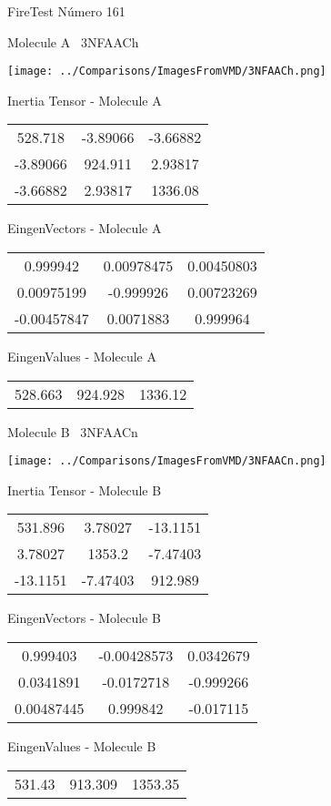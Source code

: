\vtab[-3cm]
\begin{center}
{\large FireTest \tab Número 161}
\end{center}
\begin{multicols}{2}
\begin{center}

Molecule A \
3NFAACh

\texttt{[image: ../Comparisons/ImagesFromVMD/3NFAACh.png]}

Inertia Tensor - Molecule A \\
\begin{tabular}{|c c c|}
528.718	 & 	-3.89066	 & 	-3.66882	 \\
-3.89066	 & 	924.911	 & 	2.93817	 \\
-3.66882	 & 	2.93817	 & 	1336.08
\end{tabular}

\vtab
 EingenVectors - Molecule A     \\
\begin{tabular}{|c c c|}
0.999942	 & 	0.00978475	 & 	0.00450803	 \\
0.00975199	 & 	-0.999926	 & 	0.00723269	 \\
-0.00457847	 & 	0.0071883	 & 	0.999964
\end{tabular}

\vtab
 EingenValues - Molecule A     \\
\begin{tabular}{|c c c|}
528.663	 & 	924.928	 & 	1336.12	 \\
\end{tabular}
\columnbreak

Molecule B \
3NFAACn

\texttt{[image: ../Comparisons/ImagesFromVMD/3NFAACn.png]}

Inertia Tensor - Molecule B \\
\begin{tabular}{|c c c|}
531.896	 & 	3.78027	 & 	-13.1151	 \\
3.78027	 & 	1353.2	 & 	-7.47403	 \\
-13.1151	 & 	-7.47403	 & 	912.989
\end{tabular}

\vtab
 EingenVectors - Molecule B     \\
\begin{tabular}{|c c c|}
0.999403	 & 	-0.00428573	 & 	0.0342679	 \\
0.0341891	 & 	-0.0172718	 & 	-0.999266	 \\
0.00487445	 & 	0.999842	 & 	-0.017115
\end{tabular}

\vtab
 EingenValues - Molecule B     \\
\begin{tabular}{|c c c|}
531.43	 & 	913.309	 & 	1353.35	 \\
\end{tabular}

\end{center}
\end{multicols}

